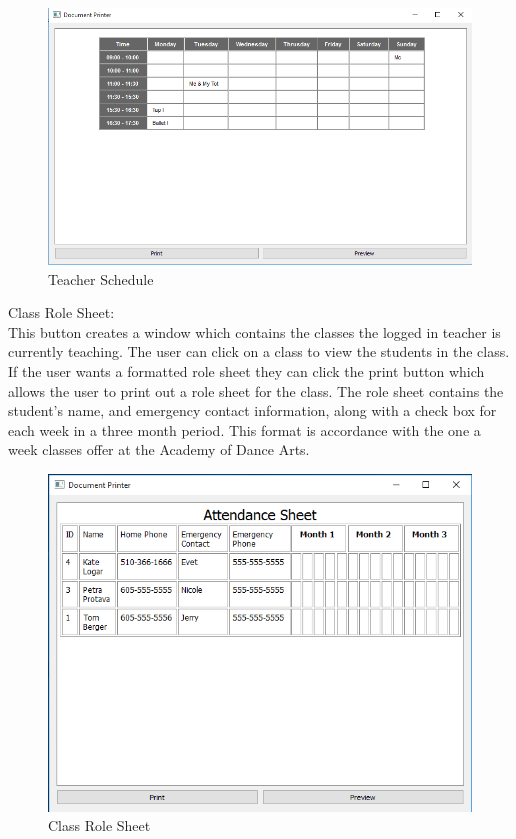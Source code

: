 \begin{figure}
  \includegraphics[width=\linewidth]{pics/userGuide/teacherSchedule.png}
  \caption{Teacher Schedule}
  \label{fig:User doc: Teacher Schedule}
\end{figure}


Class Role Sheet:\\
This button creates a window which contains the classes the logged in teacher is currently teaching. The user can click on a class to view the students in the class. If the user wants a formatted role sheet they can click the print button which allows the user to print out a role sheet for the class. The role sheet contains the student's name, and emergency contact information, along with a check box for each week in a three month period. This format is accordance with the one a week classes offer at the Academy of Dance Arts.\\

\begin{figure}
  \includegraphics[width=\linewidth]{pics/userGuide/role.png}
  \caption{Class Role Sheet}
  \label{fig:User doc: Class Role Sheet}
\end{figure}

